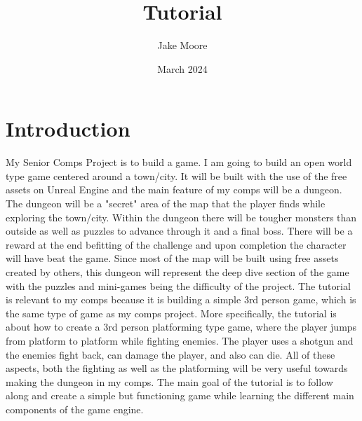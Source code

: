 \documentclass[10pt, twocolumn]{article}
\title{Tutorial}
\author{Jake Moore}
\date{March 2024}
\begin{document}
\maketitle

\section{Introduction}
 My Senior Comps Project is to build a game. I am going to build an open world type game centered around a town/city. It will be built with the use of the free assets on Unreal Engine and the main feature of my comps will be a dungeon. The dungeon will be a "secret" area of the map that the player finds while exploring the town/city. Within the dungeon there will be tougher monsters than outside as well as puzzles to advance through it and a final boss. There will be a reward at the end befitting of the challenge and upon completion the character will have beat the game. Since most of the map will be built using free assets created by others, this dungeon will represent the deep dive section of the game with the puzzles and mini-games being the difficulty of the project.
 The tutorial is relevant to my comps because it is building a simple 3rd person game, which is the same type of game as my comps project. More specifically, the tutorial is about how to create a 3rd person platforming type game, where the player jumps from platform to platform while fighting enemies. The player uses a shotgun and the enemies fight back, can damage the player, and also can die. All of these aspects, both the fighting as well as the platforming will be very useful towards making the dungeon in my comps. The main goal of the tutorial is to follow along and create a simple but functioning game while learning the different main components of the game engine.
\end{document}
